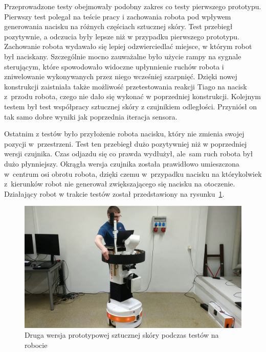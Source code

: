 Przeprowadzone testy obejmowały podobny zakres co testy pierwszego prototypu. Pierwszy test polegał na teście pracy i zachowania robota pod wpływem generowania nacisku na różnych częściach sztucznej skóry. Test przebiegł pozytywnie, a odczucia były lepsze niż w przypadku pierwszego prototypu. Zachowanie robota wydawało się lepiej odzwierciedlać miejsce, w którym robot był naciskany. Szczególnie mocno zauważalne było użycie rampy na sygnale sterującym, które spowodowało widoczne upłynnienie ruchów robota i zniwelowanie wykonywanych przez niego wcześniej szarpnięć. Dzięki nowej konstrukcji zaistniała także możliwość przetestowania reakcji Tiago na nacisk z~przodu robota, czego nie dało się wykonać w poprzedniej konstrukcji. Kolejnym testem był test współpracy sztucznej skóry z czujnikiem odległości. Przyniósł on tak samo dobre wyniki jak poprzednia iteracja sensora. 

Ostatnim z testów było przyłożenie robota nacisku, który nie zmienia swojej pozycji w~przestrzeni. Test ten przebiegł dużo pozytywniej niż w poprzedniej wersji czujnika. Czas odjazdu się co prawda wydłużył, ale~sam ruch robota był dużo płynniejszy. Okrągła wersja czujnika została prawidłowo umieszczona w~centrum osi obrotu robota, dzięki czemu w~przypadku nacisku na którykolwiek z~kierunków robot nie generował zwiększającego się nacisku na otoczenie. Działający robot w trakcie testów został przedstawiony na rysunku~\ref{f_test_test_1}.


\begin{figure}[!h]
    \centering 
    \includegraphics[width=0.95\linewidth]{img/test_okr_test_1.jpg}
    \caption{Druga wersja prototypowej sztucznej skóry podczas testów na robocie}
    \label{f_test_test_1}
\end{figure}

